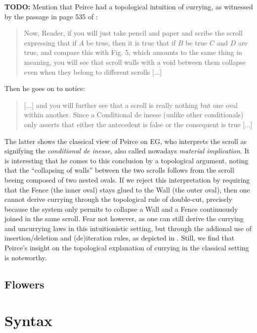 \textbf{TODO:} Mention that Peirce had a topological intuition of currying, as
witnessed by the passage in page 535 of \cite{peirce_prolegomena_1906}:
\begin{quote}
Now, Reader, if you will just take pencil and paper and scribe the scroll
expressing that if $A$ be true, then it is true that if $B$ be true $C$ and $D$
are true, and compare this with Fig. 5, which amounts to the same thing in
meaning, you will see that scroll walls with a void between them collapse even
when they belong to different scrolls [...]
\end{quote}
Then he goes on to notice:
\begin{quote}
[...] and you will further see that a scroll is really nothing but one oval
within another. Since a Conditional de inesse (unlike other conditionals) only
asserts that either the antecedent is false or the consequent is true [...]
\end{quote}
The latter shows the classical view of Peirce on EG, who interprets the scroll
as signifying the \textit{conditional de inesse}, also called nowadays
\emph{material implication}. It is interesting that he comes to this conclusion
by a topological argument, noting that the ``collapsing of walls'' between the
two scrolls follows from the scroll beeing composed of two nested ovals. If we
reject this interpretation by requiring that the Fence (the inner oval) stays
glued to the Wall (the outer oval), then one cannot derive currying through the
topological rule of double-cut, precisely because the system only permits to
collapse a Wall and a Fence continuously joined in the same scroll. Fear not
however, as one can still derive the currying and uncurrying laws in this
intuitionistic setting, but through the addional use of insertion/deletion and
(de)iteration rules, as depicted in . Still, we find that
Peirce's insight on the topological explanation of currying in the classical
setting is noteworthy.

\subsection{Flowers}


\section*{Syntax}

